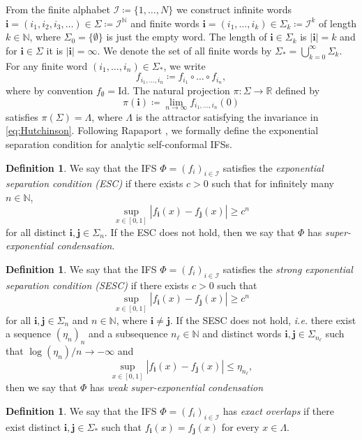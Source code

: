 \documentclass[11pt,]{article}
\def\cref#1{\ref{#1}}%
\theoremstyle{definition}
\newtheorem{definition}[theorem]{Definition}
\theoremstyle{remark}
\renewcommand{\Bbb}[1]{\mathbb{#1}}
\newcommand{\bbN}{{\Bbb N}}         %
\newcommand{\bbR}{{\Bbb R}}        %
\newcommand{\0}{\mathbf{0}}
\newcommand{\ie}{{\it i.e.}\/ }
\newcommand{\bi}{\mathbf{i}}
\newcommand{\bj}{\mathbf{j}}
\begin{document}
From the finite alphabet $\mathcal{I}\coloneqq\{1,\ldots,N\}$ we construct infinite words
$\bi=(i_1,i_2,i_3,\dots) \in\Sigma \coloneqq \mathcal{I}^{\bbN}$ and finite words
$\bi=(i_1,\ldots,i_k)\in \Sigma_k\coloneqq \mathcal{I}^k$ of length $k\in\mathbb{N}$, where
$\Sigma_0=\{\emptyset\}$ is just the empty word. The length of $\bi\in\Sigma_k$ is $|\bi|=k$ and for
$\bi\in\Sigma$ it is $|\bi|=\infty$. We denote the set of all finite words by $\Sigma_* =
\bigcup_{k=0}^\infty \Sigma_k$. For any finite word $(i_1,\dots,i_n)\in\Sigma_*$, we write
\[
f_{i_1,\dots,i_n}\coloneqq f_{i_1}\circ \dots \circ f_{i_n},
\]
where by convention $f_{\emptyset}=\mathrm{Id}$. The natural projection $\pi\colon\Sigma\to\bbR$ defined by
\begin{equation}\label{eq:natProj}
\pi(\bi)\coloneqq\lim_{n\to\infty}f_{i_1,\dots,i_n}(0)
\end{equation}
satisfies $\pi(\Sigma)=\Lambda$, where $\Lambda$ is the attractor satisfying the invariance in
\cref{eq:Hutchinson}. 
Following Rapaport \cite{Rapaport_SelfConfESC25arXiv}, we formally define the exponential separation
condition for analytic self-conformal IFSs.
\begin{definition}
  We say that the IFS $\Phi=(f_i)_{i\in\mathcal{I}}$ 
  satisfies the \emph{exponential separation condition (ESC)} if there exists $c>0$ such that for
  infinitely many $n\in\mathbb{N}$,
  \[
    \sup_{x\in[0,1]} |f_{\bi}(x)-f_{\bj}(x)| \geq c^n
  \]
  for all distinct $\bi,\bj\in\Sigma_n$. If the ESC does not hold,
  then we say that $\Phi$ has \emph{super-exponential condensation}.	
\end{definition}
\begin{definition}\label{def:SESC}
  We say that the IFS $\Phi=(f_i)_{i\in\mathcal{I}}$ 
  satisfies the \emph{strong exponential separation condition (SESC)} if there exists $c>0$ such that
  \[
    \sup_{x\in[0,1]} |f_{\bi}(x)-f_{\bj}(x)| \geq c^n
  \]
  for all $\bi,\bj\in\Sigma_n$ and $n\in\bbN$, where $\bi\neq\bj$. 
  If the SESC does not hold, \ie there exist a sequence $(\eta_n)_n$ and a subsequence
  $n_{\ell}\in\bbN$ and distinct words $\bi,\bj\in\Sigma_{n_\ell}$ such that
  $\log(\eta_n)/n\to-\infty$ and
  \[
    \sup_{x\in[0,1]}|f_{\bi}(x)-f_{\bj}(x)| \leq \eta_{n_\ell},
  \]
  then we say that $\Phi$ has \emph{weak super-exponential condensation}
\end{definition}
\begin{definition}
  We say that the IFS $\Phi=(f_i)_{i\in\mathcal{I}}$ 
 has \emph{exact overlaps} if there exist distinct $\bi,\bj\in\Sigma_*$ such that
 $f_{\bi}(x)=f_{\bj}(x)$ for every $x\in\Lambda$. 
\end{definition}
\end{document}

